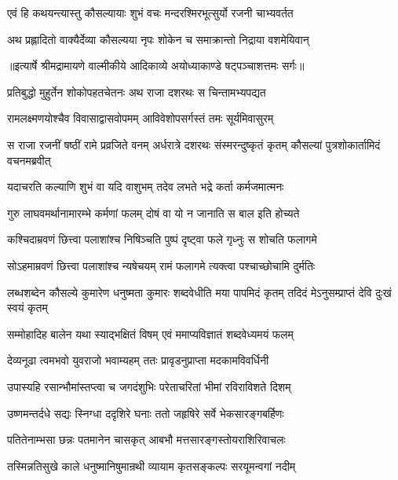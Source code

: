 \twolineshloka
{एवं हि कथयन्त्यास्तु कौसल्यायाः शुभं वचः}
{मन्दरश्मिरभूत्सुर्यो रजनी चाभ्यवर्तत} %

\twolineshloka
{अथ प्रह्लादितो वाक्यैर्देव्या कौसल्यया नृपः}
{शोकेन च समाक्रान्तो निद्राया वशमेयिवान्} %


{॥इत्यार्षे श्रीमद्रामायणे वाल्मीकीये आदिकाव्ये अयोध्याकाण्डे षट्पञ्चाशत्तमः सर्गः॥}


\twolineshloka
{प्रतिबुद्धो मुहुर्तेन शोकोपहतचेतनः}
{अथ राजा दशरथः स चिन्तामभ्यपद्यत} %

\twolineshloka
{रामलक्ष्मणयोश्चैव विवासाद्वासवोपमम्}
{आविवेशोपसर्गस्तं तमः सूर्यमिवासुरम्} %

\threelineshloka
{स राजा रजनीं षष्ठीं रामे प्रव्रजिते वनम्}
{अर्धरात्रे दशरथः संस्मरन्दुष्कृतं कृतम्}
{कौसल्यां पुत्रशोकार्तामिदं वचनमब्रवीत्} %

\twolineshloka
{यदाचरति कल्याणि शुभं वा यदि वाशुभम्}
{तदेव लभते भद्रे कर्ता कर्मजमात्मनः} %

\twolineshloka
{गुरु लाघवमर्थानामारम्भे कर्मणां फलम्}
{दोषं वा यो न जानाति स बाल इति होच्यते} %

\twolineshloka
{कश्चिदाम्रवणं छित्त्वा पलाशांश्च निषिञ्चति}
{पुष्पं दृष्ट्वा फले गृध्नुः स शोचति फलागमे} %

\twolineshloka
{सोऽहमाम्रवणं छित्त्वा पलाशांश्च न्यषेचयम्}
{रामं फलागमे त्यक्त्वा पश्चाच्छोचामि दुर्मतिः} %

\threelineshloka
{लब्धशब्देन कौसल्ये कुमारेण धनुष्मता}
{कुमारः शब्दवेधीति मया पापमिदं कृतम्}
{तदिदं मेऽनुसम्प्राप्तं देवि दुःखं स्वयं कृतम्} %

\twolineshloka
{सम्मोहादिह बालेन यथा स्याद्भक्षितं विषम्}
{एवं ममाप्यविज्ञातं शब्दवेध्यमयं फलम्} %

\twolineshloka
{देव्यनूढा त्वमभवो युवराजो भवाम्यहम्}
{ततः प्रावृडनुप्राप्ता मदकामविवर्धिनी} %

\twolineshloka
{उपास्यहि रसान्भौमांस्तप्त्वा च जगदंशुभिः}
{परेताचरितां भीमां रविराविशते दिशम्} %

\twolineshloka
{उष्णमन्तर्दधे सद्यः स्निग्धा ददृशिरे घनाः}
{ततो जहृषिरे सर्वे भेकसारङ्गबर्हिणः} %

\twolineshloka
{पतितेनाम्भसा छन्नः पतमानेन चासकृत्}
{आबभौ मत्तसारङ्गस्तोयराशिरिवाचलः} %

\twolineshloka
{तस्मिन्नतिसुखे काले धनुष्मानिषुमान्रथी}
{व्यायाम कृतसङ्कल्पः सरयूमन्वगां नदीम्} %

